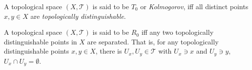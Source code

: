 \begin{definition}
	[$T_0$ spaces]
	\label{def: T_1 spaces}
	A topological space $(X, \mathcal T)$ is said to be $T_0$ or \textit{Kolmogorov}, iff all distinct points $x,y \in X$ are \textit{topologically distinguishable}.
\end{definition}


\begin{definition}
	[$R_0$ spaces]
	\label{def: R_0 spaces}
	A topological space $(X, \mathcal T)$ is said to be $R_0$ iff any two topologically distinguishable points in $X$ are separated. That is, for any topologically distinguishable points $x,y \in X$, there is $U_x, U_y \in \mathcal T$ with $U_x \ni x$ and $U_y \ni y$, $U_x \cap U_y = \emptyset$.
\end{definition}













































%